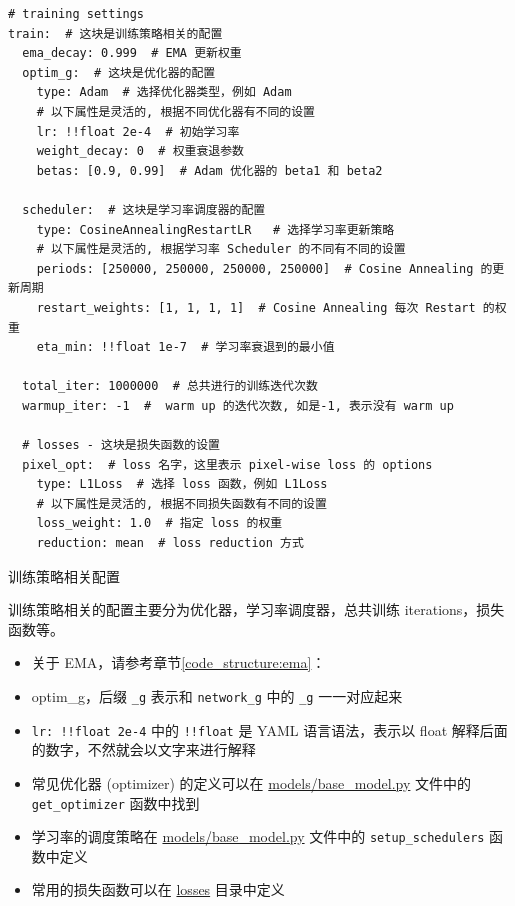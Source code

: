 \documentclass[../main.tex]{subfiles}
\begin{document}
\begin{verbatim}
# training settings
train:  # 这块是训练策略相关的配置
  ema_decay: 0.999  # EMA 更新权重
  optim_g:  # 这块是优化器的配置
    type: Adam  # 选择优化器类型，例如 Adam
    # 以下属性是灵活的, 根据不同优化器有不同的设置
    lr: !!float 2e-4  # 初始学习率
    weight_decay: 0  # 权重衰退参数
    betas: [0.9, 0.99]  # Adam 优化器的 beta1 和 beta2

  scheduler:  # 这块是学习率调度器的配置
    type: CosineAnnealingRestartLR   # 选择学习率更新策略
    # 以下属性是灵活的, 根据学习率 Scheduler 的不同有不同的设置
    periods: [250000, 250000, 250000, 250000]  # Cosine Annealing 的更新周期
    restart_weights: [1, 1, 1, 1]  # Cosine Annealing 每次 Restart 的权重
    eta_min: !!float 1e-7  # 学习率衰退到的最小值

  total_iter: 1000000  # 总共进行的训练迭代次数
  warmup_iter: -1  #  warm up 的迭代次数, 如是-1, 表示没有 warm up

  # losses - 这块是损失函数的设置
  pixel_opt:  # loss 名字，这里表示 pixel-wise loss 的 options
    type: L1Loss  # 选择 loss 函数，例如 L1Loss
    # 以下属性是灵活的, 根据不同损失函数有不同的设置
    loss_weight: 1.0  # 指定 loss 的权重
    reduction: mean  # loss reduction 方式
\end{verbatim}

\begin{exampleBox}[righthand ratio=0.00, sidebyside, sidebyside align=center, lower separated=false]{训练策略相关配置}

    训练策略相关的配置主要分为优化器，学习率调度器，总共训练 iterations，损失函数等。
    \begin{itemize}
        \item 关于 EMA，请参考章节\ref{code_structure:ema}：
        \item optim\_g，后缀 \texttt{\_g} 表示和 \texttt{network\_g} 中的 \texttt{\_g} 一一对应起来
        \item \texttt{lr: !!float 2e-4} 中的 \texttt{!!float} 是 YAML 语言语法，表示以 float 解释后面的数字，不然就会以文字来进行解释
        \item 常见优化器 (optimizer) 的定义可以在 \href{https://github.com/XPixelGroup/BasicSR/blob/master/basicsr/models/base_model.py}{models/base\_model.py} 文件中的 \texttt{get\_optimizer} 函数中找到
        \item 学习率的调度策略在 \href{https://github.com/XPixelGroup/BasicSR/blob/master/basicsr/models/base_model.py}{models/base\_model.py}  文件中的 \texttt{setup\_schedulers} 函数中定义
        \item 常用的损失函数可以在 \href{https://github.com/XPixelGroup/BasicSR/tree/master/basicsr/losses}{losses} 目录中定义
    \end{itemize}
\end{exampleBox}
\end{document}
